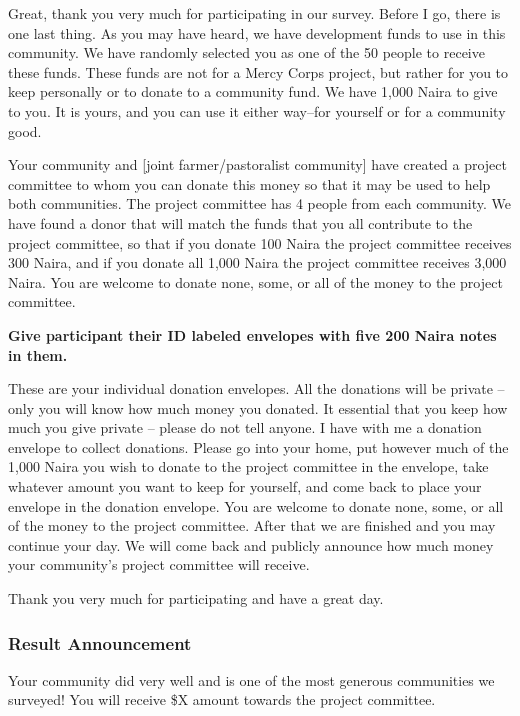 \documentclass[
]{article}
\begin{document}
Great, thank you very much for participating in our survey. Before I go,
there is one last thing. As you may have heard, we have development
funds to use in this community. We have randomly selected you as one of
the 50 people to receive these funds. These funds are not for a Mercy
Corps project, but rather for you to keep personally or to donate to a
community fund. We have 1,000 Naira to give to you. It is yours, and you
can use it either way--for yourself or for a community good.

Your community and {[}joint farmer/pastoralist community{]} have created
a project committee to whom you can donate this money so that it may be
used to help both communities. The project committee has 4 people from
each community. We have found a donor that will match the funds that you
all contribute to the project committee, so that if you donate 100 Naira
the project committee receives 300 Naira, and if you donate all 1,000
Naira the project committee receives 3,000 Naira. You are welcome to
donate none, some, or all of the money to the project committee.

\textbf{Give participant their ID labeled envelopes with five 200 Naira
notes in them.}

These are your individual donation envelopes. All the donations will be
private -- only you will know how much money you donated. It essential
that you keep how much you give private -- please do not tell anyone. I
have with me a donation envelope to collect donations. Please go into
your home, put however much of the 1,000 Naira you wish to donate to the
project committee in the envelope, take whatever amount you want to keep
for yourself, and come back to place your envelope in the donation
envelope. You are welcome to donate none, some, or all of the money to
the project committee. After that we are finished and you may continue
your day. We will come back and publicly announce how much money your
community's project committee will receive.

Thank you very much for participating and have a great day.

\hypertarget{result-announcement}{%
\subsubsection{Result Announcement}\label{result-announcement}}

Your community did very well and is one of the most generous communities
we surveyed! You will receive \$X amount towards the project committee.
\end{document}

